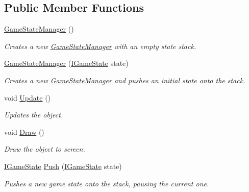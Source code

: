 \subsection*{Public Member Functions}
\begin{DoxyCompactItemize}
\item 
\hyperlink{class_tri_devs_1_1_tri_engine_1_1_state_management_1_1_game_state_manager_a62829e836ebdf646d01a13b30ec309c3}{Game\-State\-Manager} ()
\begin{DoxyCompactList}\small\item\em Creates a new \hyperlink{class_tri_devs_1_1_tri_engine_1_1_state_management_1_1_game_state_manager}{Game\-State\-Manager} with an empty state stack. \end{DoxyCompactList}\item 
\hyperlink{class_tri_devs_1_1_tri_engine_1_1_state_management_1_1_game_state_manager_a6c6dcc227721968999424375bb80691b}{Game\-State\-Manager} (\hyperlink{interface_tri_devs_1_1_tri_engine_1_1_state_management_1_1_i_game_state}{I\-Game\-State} state)
\begin{DoxyCompactList}\small\item\em Creates a new \hyperlink{class_tri_devs_1_1_tri_engine_1_1_state_management_1_1_game_state_manager}{Game\-State\-Manager} and pushes an initial state onto the stack. \end{DoxyCompactList}\item 
void \hyperlink{class_tri_devs_1_1_tri_engine_1_1_state_management_1_1_game_state_manager_a28f742dec4880379dedef8ad8b0100d2}{Update} ()
\begin{DoxyCompactList}\small\item\em Updates the object. \end{DoxyCompactList}\item 
void \hyperlink{class_tri_devs_1_1_tri_engine_1_1_state_management_1_1_game_state_manager_aaa9306a2a4bae1aed8be4f78767ce978}{Draw} ()
\begin{DoxyCompactList}\small\item\em Draw the object to screen. \end{DoxyCompactList}\item 
\hyperlink{interface_tri_devs_1_1_tri_engine_1_1_state_management_1_1_i_game_state}{I\-Game\-State} \hyperlink{class_tri_devs_1_1_tri_engine_1_1_state_management_1_1_game_state_manager_a3184b17df69f9ec9f2112d0317b559ee}{Push} (\hyperlink{interface_tri_devs_1_1_tri_engine_1_1_state_management_1_1_i_game_state}{I\-Game\-State} state)
\begin{DoxyCompactList}\small\item\em Pushes a new game state onto the stack, pausing the current one. \end{DoxyCompactList}\item 

\end{DoxyCompactItemize}
